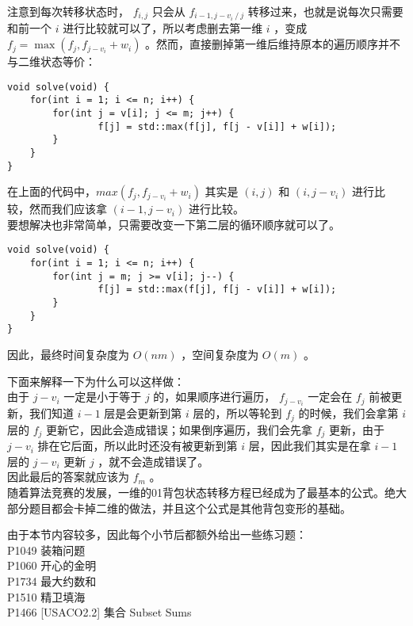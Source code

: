 \documentclass{beamer}
\begin{document}
\begin{frame}[fragile]
注意到每次转移状态时， $f_{i,j}$ 只会从 $f_{i - 1, j - v_i \ / \ j}$ 转移过来，也就是说每次只需要和前一个 $i$ 进行比较就可以了，所以考虑删去第一维 $i$ ，变成 $f_j = \max(f_j, f_{j - v_i} + w_i)$ 。然而，直接删掉第一维后维持原本的遍历顺序并不与二维状态等价：\\ 
\begin{onlyenv}
\begin{verbatim}
void solve(void) {
    for(int i = 1; i <= n; i++) {
        for(int j = v[i]; j <= m; j++) {
                f[j] = std::max(f[j], f[j - v[i]] + w[i]);
        }
    }
}
\end{verbatim}
\end{onlyenv}
在上面的代码中，$max(f_j, f_{j - v_i} + w_i)$ 其实是 $(i, j)$ 和 $(i, j - v_i)$ 进行比较，然而我们应该拿 $(i - 1, j - v_i)$ 进行比较。\\ 
要想解决也非常简单，只需要改变一下第二层的循环顺序就可以了。
\end{frame}
\begin{frame}[fragile]
\begin{onlyenv}
\begin{verbatim}
void solve(void) {
    for(int i = 1; i <= n; i++) {
        for(int j = m; j >= v[i]; j--) {
                f[j] = std::max(f[j], f[j - v[i]] + w[i]);
        }
    }
}
\end{verbatim}
\end{onlyenv}
因此，最终时间复杂度为 $O(nm)$ ，空间复杂度为 $O(m)$ 。
\end{frame}
\begin{frame}
下面来解释一下为什么可以这样做：\\ 
由于 $j - v_i$ 一定是小于等于 $j$ 的，如果顺序进行遍历， $f_{j - v_i}$ 一定会在 $f_j$ 前被更新，我们知道 $i - 1$ 层是会更新到第 $i$ 层的，所以等轮到 $f_j$ 的时候，我们会拿第 $i$ 层的 $f_j$ 更新它，因此会造成错误；如果倒序遍历，我们会先拿 $f_j$ 更新，由于 $j - v_i$ 排在它后面，所以此时还没有被更新到第 $i$ 层，因此我们其实是在拿 $i - 1$ 层的 $j - v_i$ 更新 $j$ ，就不会造成错误了。 \\ 
因此最后的答案就应该为 $f_m$ 。\\ 
随着算法竞赛的发展，一维的01背包状态转移方程已经成为了最基本的公式。绝大部分题目都会卡掉二维的做法，并且这个公式是其他背包变形的基础。
\end{frame}
\begin{frame}
由于本节内容较多，因此每个小节后都额外给出一些练习题：\\ 
P1049 装箱问题\\ 
P1060 开心的金明\\
P1734 最大约数和\\
P1510 精卫填海\\
P1466 [USACO2.2] 集合 Subset Sums
\end{frame}
\end{document}
